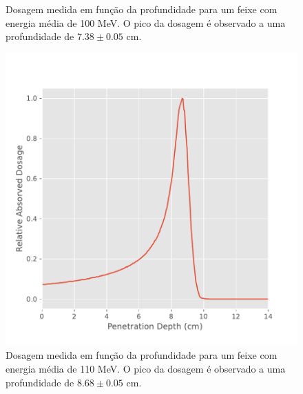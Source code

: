 \documentclass[a4paper, 12pt]{article} %
\begin{document}
\begin{figure}[H]
\begin{minipage}[r]{.49\linewidth}
			\caption{Dosagem medida em função da profundidade para um feixe com energia média de 100 MeV. O pico da dosagem é observado a uma profundidade de $7.38  \pm 0.05$ cm.}
			\label{fig:bragg_peak100}
		\end{minipage}
	\end{figure}
	\begin{figure}[H]
		\begin{minipage}[r]{.49\linewidth}
			\centering
			\includegraphics[width=\linewidth]{bragg_peak_110mev.pdf}
			\caption{Dosagem medida em função da profundidade para um feixe com energia média de 110 MeV. O pico da dosagem é observado a uma profundidade de $8.68  \pm 0.05$ cm.}
			\label{fig:bragg_peak110}
		\end{minipage}
		\hspace{.01\linewidth}
		\begin{minipage}[r]{.49\linewidth}
			\centering

\end{minipage}
\end{figure}
\end{document}
